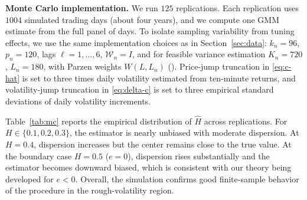 \documentclass[ecta,nameyear,draft]{econsocart}
\def\wh{\widehat}
\newcommand{\1}{\mathbf 1}
\newcommand{\calW}{\mathcal{W}}
\numberwithin{equation}{section}
\begin{document}
\textbf{Monte Carlo implementation. } We run $125$ replications. Each replication uses $1004$ simulated trading days (about four years), and we compute one GMM estimate from the full panel of days. To isolate sampling variability from tuning effects, we use the same implementation choices as in Section~\ref{sec:data}: $k_n=96$, $p_n=120$, lags $\ell=1,\ldots,6$, $\calW_n=I$, and for feasible variance estimation $K_n=720$, $L_n=180$, with Parzen weights $W(L,L_n)$ (\cite{li2016generalized}). Price-jump truncation in \eqref{eq:c-hat} is set to three times daily volatility estimated from ten-minute returns, and volatility-jump truncation in \eqref{eq:delta-c} is set to three empirical standard deviations of daily volatility increments.

Table~\ref{tab:mc} reports the empirical distribution of $\wh H$ across replications. For $H\in\{0.1,0.2,0.3\}$, the estimator is nearly unbiased with moderate dispersion. At $H=0.4$, dispersion increases but the center remains close to the true value. At the boundary case $H=0.5$ ($e=0$), dispersion rises substantially and the estimator becomes downward biased, which is consistent with our theory being developed for $e<0$. Overall, the simulation confirms good finite-sample behavior of the procedure in the rough-volatility region.
\end{document}

